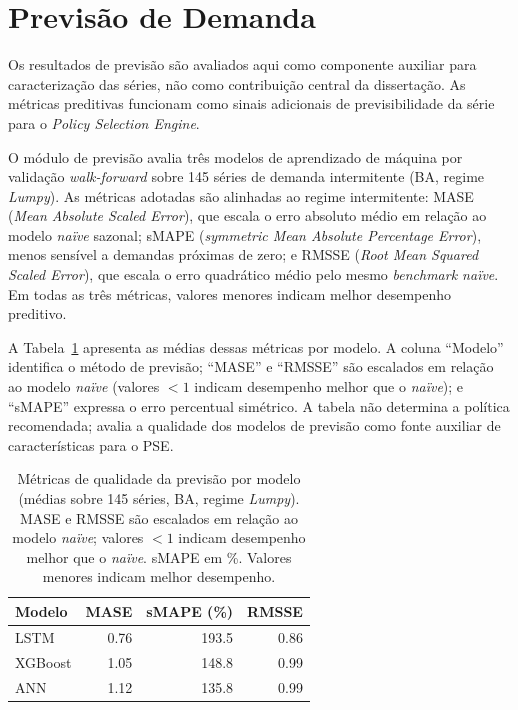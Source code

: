 \section{Previsão de Demanda}

\noindent Os resultados de previsão são avaliados aqui como componente auxiliar para caracterização das séries, não como contribuição central da dissertação. As métricas preditivas funcionam como sinais adicionais de previsibilidade da série para o \textit{Policy Selection Engine}.

O módulo de previsão avalia três modelos de aprendizado de máquina por validação \textit{walk-forward} sobre 145 séries de demanda intermitente (BA, regime \textit{Lumpy}). As métricas adotadas são alinhadas ao regime intermitente: MASE (\textit{Mean Absolute Scaled Error}), que escala o erro absoluto médio em relação ao modelo \textit{naïve} sazonal; sMAPE (\textit{symmetric Mean Absolute Percentage Error}), menos sensível a demandas próximas de zero; e RMSSE (\textit{Root Mean Squared Scaled Error}), que escala o erro quadrático médio pelo mesmo \textit{benchmark naïve}. Em todas as três métricas, valores menores indicam melhor desempenho preditivo.

A Tabela~\ref{tab:forecast_metrics} apresenta as médias dessas métricas por modelo. A coluna ``Modelo'' identifica o método de previsão; ``MASE'' e ``RMSSE'' são escalados em relação ao modelo \textit{naïve} (valores $< 1$ indicam desempenho melhor que o \textit{naïve}); e ``sMAPE'' expressa o erro percentual simétrico. A tabela não determina a política recomendada; avalia a qualidade dos modelos de previsão como fonte auxiliar de características para o PSE.

\begin{table}[ht]
\centering
\small
\caption{Métricas de qualidade da previsão por modelo (médias sobre 145 séries, BA, regime \textit{Lumpy}). MASE e RMSSE são escalados em relação ao modelo \textit{naïve}; valores $< 1$ indicam desempenho melhor que o \textit{naïve}. sMAPE em \%. Valores menores indicam melhor desempenho.}
\label{tab:forecast_metrics}
\begin{tabular}{@{}lrrr@{}}
\toprule
Modelo   & MASE & sMAPE (\%) & RMSSE \\
\midrule
LSTM     & 0.76 & 193.5 & 0.86 \\
XGBoost  & 1.05 & 148.8 & 0.99 \\
ANN      & 1.12 & 135.8 & 0.99 \\
\bottomrule
\end{tabular}
\end{table}

